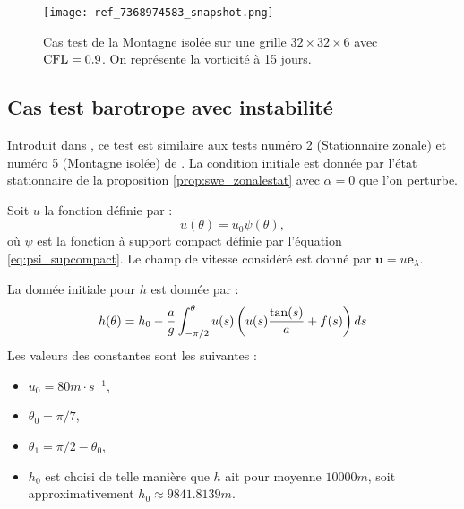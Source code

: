 \begin{figure}[htbp]
\begin{center}
\texttt{[image: ref\_7368974583\_snapshot.png]}
\end{center}
\caption{Cas test de la Montagne isolée \cite{Williamson1992} sur une grille $32 \times 32 \times 6$ avec $\text{CFL}=0.9$. On représente la vorticité à 15 jours.}
\label{fig: williamson 5 vorticité}
\end{figure}





















\subsection{Cas test barotrope avec instabilité}

Introduit dans \cite{Galewsky2004}, ce test est similaire aux tests numéro 2 (Stationnaire zonale) et numéro 5 (Montagne isolée) de \cite{Williamson1992}. La condition initiale est donnée par l'état stationnaire de la proposition \ref{prop:swe_zonalestat} avec $\alpha=0$ que l'on perturbe.

Soit $u$ la fonction définie par :
\begin{equation}
u(\theta) = u_{0} \psi(\theta),
\end{equation}
où $\psi$ est la fonction à support compact définie par l'équation \eqref{eq:psi_supcompact}. Le champ de vitesse considéré est donné par $\mathbf{u} = u \mathbf{e}_{\lambda}$.

La donnée initiale pour $h$ est donnée par :
\begin{equation}
h(\theta) = h_0 - \dfrac{a}{g} \displaystyle\int^{\theta}_{-\pi/2} u(s) \left( u(s) \dfrac{\tan (s)}{a} + f(s) \right) ds
\end{equation}
Les valeurs des constantes sont les suivantes :
\begin{itemize}
\item $u_{0}=80 \si{m} \cdot  \si{s^{-1}}$,
\item $\theta_0 = \pi/7$,
\item $\theta_1 = \pi/2 - \theta_0$,
\item $h_0$ est choisi de telle manière que $h$ ait pour moyenne $10000 \si{m}$, soit approximativement $h_0 \approx 9841.8139 \si{m}$.
\end{itemize}

